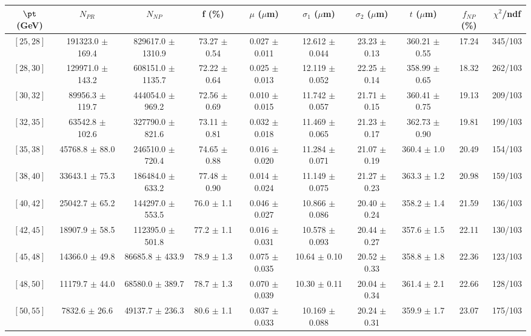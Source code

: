 \begin{tabular}{c||c|c|c|c|c|c|c||c|c}
$\pt$ (GeV) & $N_{PR}$ & $N_{NP}$ & f (\%) & $\mu$ ($\mu$m) & $\sigma_1$ ($\mu$m) & $\sigma_2$ ($\mu$m)  & $t$ ($\mu$m) & $f_{NP}$ (\%) & $\chi^2$/ndf \\
\hline
$[25, 28]$ & 191323.0 $\pm$ 169.4 & 829617.0 $\pm$ 1310.9 & 73.27 $\pm$ 0.54 & 0.027 $\pm$ 0.011 & 12.612 $\pm$ 0.044 & 23.23 $\pm$ 0.13 & 360.21 $\pm$ 0.55 & 17.24 & 345/103\\
$[28, 30]$ & 129971.0 $\pm$ 143.2 & 608151.0 $\pm$ 1135.7 & 72.22 $\pm$ 0.64 & 0.025 $\pm$ 0.013 & 12.119 $\pm$ 0.052 & 22.25 $\pm$ 0.14 & 358.99 $\pm$ 0.65 & 18.32 & 262/103\\
$[30, 32]$ & 89956.3 $\pm$ 119.7 & 444054.0 $\pm$ 969.2 & 72.56 $\pm$ 0.69 & 0.010 $\pm$ 0.015 & 11.742 $\pm$ 0.057 & 21.71 $\pm$ 0.15 & 360.41 $\pm$ 0.75 & 19.13 & 209/103\\
$[32, 35]$ & 63542.8 $\pm$ 102.6 & 327790.0 $\pm$ 821.6 & 73.11 $\pm$ 0.81 & 0.032 $\pm$ 0.018 & 11.469 $\pm$ 0.065 & 21.23 $\pm$ 0.17 & 362.73 $\pm$ 0.90 & 19.81 & 199/103\\
$[35, 38]$ & 45768.8 $\pm$ 88.0 & 246510.0 $\pm$ 720.4 & 74.65 $\pm$ 0.88 & 0.016 $\pm$ 0.020 & 11.284 $\pm$ 0.071 & 21.07 $\pm$ 0.19 & 360.4 $\pm$ 1.0 & 20.49 & 154/103\\
$[38, 40]$ & 33643.1 $\pm$ 75.3 & 186484.0 $\pm$ 633.2 & 77.48 $\pm$ 0.90 & 0.014 $\pm$ 0.024 & 11.149 $\pm$ 0.075 & 21.27 $\pm$ 0.23 & 363.3 $\pm$ 1.2 & 20.98 & 159/103\\
$[40, 42]$ & 25042.7 $\pm$ 65.2 & 144297.0 $\pm$ 553.5 & 76.0 $\pm$ 1.1 & 0.046 $\pm$ 0.027 & 10.866 $\pm$ 0.086 & 20.40 $\pm$ 0.24 & 358.2 $\pm$ 1.4 & 21.59 & 136/103\\
$[42, 45]$ & 18907.9 $\pm$ 58.5 & 112395.0 $\pm$ 501.8 & 77.2 $\pm$ 1.1 & 0.016 $\pm$ 0.031 & 10.578 $\pm$ 0.093 & 20.44 $\pm$ 0.27 & 357.6 $\pm$ 1.5 & 22.11 & 130/103\\
$[45, 48]$ & 14366.0 $\pm$ 49.8 & 86685.8 $\pm$ 433.9 & 78.9 $\pm$ 1.3 & 0.075 $\pm$ 0.035 & 10.64 $\pm$ 0.10 & 20.52 $\pm$ 0.33 & 358.8 $\pm$ 1.8 & 22.36 & 123/103\\
$[48, 50]$ & 11179.7 $\pm$ 44.0 & 68580.0 $\pm$ 389.7 & 78.7 $\pm$ 1.3 & 0.070 $\pm$ 0.039 & 10.30 $\pm$ 0.11 & 20.04 $\pm$ 0.34 & 361.4 $\pm$ 2.1 & 22.66 & 128/103\\
$[50, 55]$ & 7832.6 $\pm$ 26.6 & 49137.7 $\pm$ 236.3 & 80.6 $\pm$ 1.1 & 0.037 $\pm$ 0.033 & 10.169 $\pm$ 0.088 & 20.24 $\pm$ 0.31 & 359.9 $\pm$ 1.7 & 23.07 & 175/103\\

\end{tabular}

